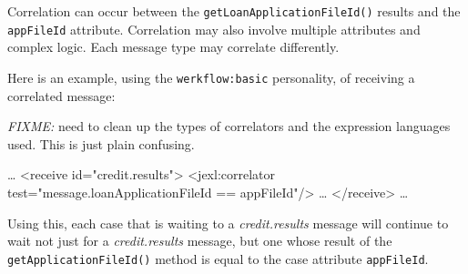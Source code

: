 Correlation can occur between the \verb|getLoanApplicationFileId()|
results and the \verb|appFileId| attribute.  Correlation may also
involve multiple attributes and complex logic.  Each message
type may correlate differently.

Here is an example, using the \verb|werkflow:basic| personality, of 
receiving a correlated message:

\emph{FIXME:} need to clean up the types of correlators and the
expression languages used.  This is just plain confusing.

\begin{codelisting}
\dots
<receive id="credit.results">
    <jexl:correlator test="message.loanApplicationFileId == appFileId"/>
    \dots
</receive>
\dots
\end{codelisting}

Using this, each case that is waiting to  a
\emph{credit.results} message will continue to wait
not just for a \emph{credit.results} message, but
one whose result of the \verb|getApplicationFileId()|
method is equal to the case attribute \verb|appFileId|.

